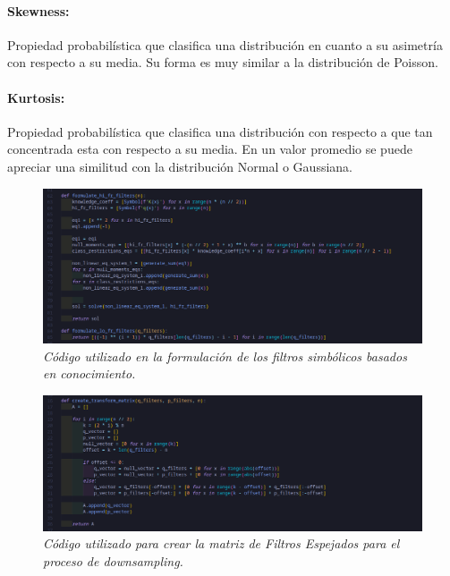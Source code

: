 \documentclass[11pt]{article}
\begin{document}
\paragraph*{Skewness:}
Propiedad probabilística que clasifica una distribución en cuanto a su asimetría con respecto a su media. Su forma es muy similar a la distribución de Poisson.

\paragraph*{Kurtosis:}
Propiedad probabilística que clasifica una distribución con respecto a que tan concentrada esta con respecto a su media. En un valor promedio se puede apreciar una similitud con la distribución Normal o Gaussiana.

\pagebreak

\begin{figure}
    \includegraphics[width=\textwidth]{filters}
    \caption{\it Código utilizado en la formulación de los filtros simbólicos basados en conocimiento.}
\end{figure}

\begin{figure}
    \includegraphics[width=\textwidth]{filter_bank}
    \caption{\it Código utilizado para crear la matriz de Filtros Espejados para el proceso de downsampling.}
\end{figure}
\end{document}
